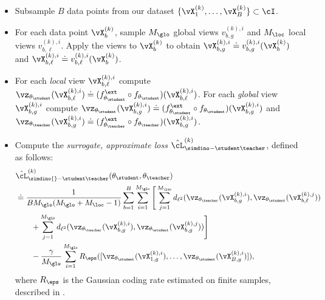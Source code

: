 \documentclass[../../book-main.tex]{subfiles}
\begin{document}
\begin{itemize}
\item Subsample \(B\) data points from our dataset \(\{\vX_{1}^{(k)},
    \dots, \vX_{B}^{(k)}\} \subset \cI\).
\item For each data point \(\vX_{b}^{(k)}\), sample \(M_{\glo}\)
    global views \(v_{b, g}^{(k), i}\) and \(M_{\loc}\) local views
    \(v_{b, \ell}^{(k), i}\).
    Apply the views to \(\vX_{b}^{(k)}\) to
    obtain \(\vX_{b, g}^{(k), i} \doteq v_{b, g}^{(k),
    i}(\vX_{b}^{(k)})\) and \(\vX_{b, \ell}^{(k), i} \doteq v_{b,
    \ell}^{(k), i}(\vX_{b}^{(k)})\).
\item For each \textit{local} view \(\vX_{b, \ell}^{(k), i}\) compute
    \(\vz_{\theta_{\student}}(\vX_{b, \ell}^{(k), i}) \doteq
        (f_{\theta_{\student}}^{\ext} \circ
    f_{\theta_{\student}})(\vX_{b, \ell}^{(k), i})\).
    For each
    \textit{global} view \(\vX_{b, g}^{(k), i}\) compute
    \(\vz_{\theta_{\student}}(\vX_{b, g}^{(k), i}) \doteq
        (f_{\theta_{\student}}^{\ext} \circ
    f_{\theta_{\student}})(\vX_{b, g}^{(k), i})\) and
    \(\vz_{\theta_{\teacher}}(\vX_{b, g}^{(k), i}) \doteq
        (f_{\theta_{\teacher}}^{\ext} \circ
    f_{\theta_{\teacher}})(\vX_{b, g}^{(k), i})\).
\item Compute the \textit{surrogate, approximate loss}
    \(\hat{\cL}_{\simdino-\student\teacher}^{(k)}\), defined as follows:
    \begin{align}\label{eq:simdino_loss_teacherstudent_empirical}
        &\hat{\cL}_{\simdino{}-\student\teacher}^{(k)}(\theta_{\student},
        \theta_{\teacher}) \nonumber \\
        &\doteq
        \frac{1}{BM_{\glo}(M_{\glo} + M_{\loc} - 1)}\sum_{b =
        1}^{B}\sum_{i = 1}^{M_{\glo}}\Bigg[\sum_{j =
            1}^{M_{\loc}}d_{\ell^{2}}(\vz_{\theta_{\teacher}}(\vX_{b,
                g}^{(k), i}), \vz_{\theta_{\student}}(\vX_{b, \ell}^{(k),
            j})) \nonumber\\
            &\qquad + \sum_{j =
            1}^{M_{\glo}}d_{\ell^{2}}(\vz_{\theta_{\teacher}}(\vX_{b,
                g}^{(k), i}), \vz_{\theta_{\student}}(\vX_{b, g}^{(k),
        j}))\Bigg]\nonumber \\
        &\qquad - \frac{\gamma}{M_{\glo}}\sum_{i =
        1}^{M_{\glo}}R_{\eps}([\vz_{\theta_{\student}}(\vX_{1,
        g}^{(k), i}), \dots, \vz_{\theta_{\student}}(\vX_{B, g}^{(k),
        i})]) ,
    \end{align}
    where \(R_{\eps}\) is the Gaussian coding rate estimated on
    finite samples, described in .

\end{itemize}
\end{document}
